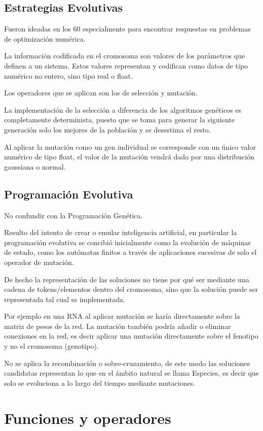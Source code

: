 \documentclass[12pt, twoside, openright]{report} %
\begin{document}
\subsection{Estrategias Evolutivas}
Fueron ideadas en los 60 especialmente para encontrar respuestas en problemas de optimización numérica. 

La información codificada en el cromosoma son valores de los parámetros que definen a un sistema. Estos valores representan y codifican como datos de tipo numérico no entero, sino tipo real o float.

Los operadores que se aplican son los de selección y mutación.

La implementación de la selección a diferencia de los algoritmos genéticos es completamente determinista, puesto que se toma para generar la siguiente generación solo los mejores de la población y se desestima el resto. 

Al aplicar la mutación como un gen individual se corresponde con un único valor numérico de tipo float, el valor de la mutación vendrá dado por una distribución gaussiana o normal.

\subsection{Programación Evolutiva}
No confundir con la Programación Genética.

Resulto del intento de crear o emular inteligencia artificial, en particular la programación evolutiva se concibió inicialmente como la evolución de máquinas de estado, como los autómatas finitos a través de aplicaciones sucesivas de solo el operador de mutación. 

De hecho la representación de las soluciones no tiene por qué ser mediante una cadena de tokens/elementos dentro del cromosoma, sino que la solución puede ser representada tal cual es implementada.

Por ejemplo en una RNA al aplicar mutación se haría directamente sobre la matriz de pesos de la red. La mutación también podría añadir o eliminar conexiones en la red, es decir aplicar una mutación directamente sobre el fenotipo y no el cromosoma (genotipo).

No se aplica la recombinación o sobre-cruzamiento, de este modo las soluciones candidatas representan lo que en el ámbito natural se llama Especies, es decir que solo se evoluciona a lo largo del tiempo mediante mutaciones.

\section{Funciones y operadores}
\end{document}
